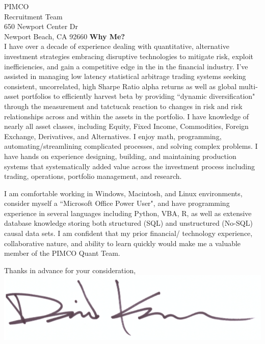 \documentclass{letter}
\begin{document}
\begin{letter}{
  PIMCO \\
  Recruitment Team \\
  650 Newport Center Dr \\
  Newport Beach, CA 92660
}
\textbf{Why Me?} \\
I have over a decade of experience dealing with quantitative, alternative investment
strategies embracing disruptive technologies to mitigate risk, exploit inefficiencies,
and gain a competitive edge in the in the financial industry. I've assisted in managing
low latency statistical arbitrage trading systems seeking consistent, uncorrelated,
high Sharpe Ratio alpha returns as well as global multi-asset portfolios to efficiently
harvest beta by providing ``dynamic diversification" through the measurement and
tatctucak reaction to changes in risk and risk relationships across and within
the assets in the portfolio. I have knowledge of nearly all asset classes, including
Equity, Fixed Income, Commodities, Foreign Exchange, Derivatives, and Alternatives.
I enjoy math, programming, automating/streamlining complicated processes, and
solving complex problems. I have hands on experience designing, building, and
maintaining production systems that systematically added value across the
investment process including trading, operations, portfolio management, and research. 

\newpage

I am comfortable working in
Windows, Macintosh, and Linux environments, consider myself a ``Microsoft Office
Power User", and have programming experience in several languages including Python,
VBA, R, as well as extensive database knowledge storing both structured (SQL)
and unstructured (No-SQL) causal data sets. I am confident that my prior financial/
technology experience, collaborative nature, and ability to learn quickly would
make me a valuable member of the PIMCO Quant Team. \\


\closing{
  Thanks in advance for your consideration, \\
  \vspace{.33in}
  \includegraphics[scale=0.33]{signature.png}
}

\end{letter}
\end{document}
